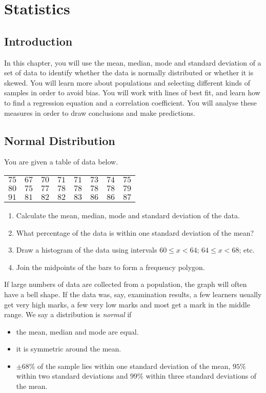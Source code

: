 \chapter{Statistics}
\label{m:s12}



\section{Introduction}
In this chapter, you will use the mean, median, mode and standard deviation of a set of data to identify whether the data is normally distributed or whether it is skewed. You will learn more about populations and selecting different kinds of samples in order to avoid bias. You will work with lines of best fit, and learn how to find a regression equation and a correlation coefficient. You will analyse these measures in order to draw conclusions and make predictions.

\section{Normal Distribution}
{You are given a table of data below. 
\begin{center}
\begin{tabular}{|cccccccc|}
\hline
$75$ & $67$ & $70$ & $71$ & $71$ & $73$ & $74$ & $75$ \\
$80$ & $75$ &$77$&$78$&$78$&$78$&$78$&$79$\\
$91$&$81$&$82$&$82$&$83$&$86$&$86$&$87$\\
\hline
\end{tabular}
\end{center}
\begin{enumerate}
\item Calculate the mean, median, mode and standard deviation of the data.
\item What percentage of the data is within one standard deviation of the mean?
\item Draw a histogram of the data using intervals $60\leq x< 64$; $64\leq x <68$; etc.
\item Join the midpoints of the bars to form a frequency polygon.
\end{enumerate}
}
If large numbers of data are collected from a population, the graph will often have a bell shape. If the data was, say, examination results, a few learners usually get very high marks, a few very low marks and most get a mark in the middle range. We say a distribution is \emph{normal} if
\begin{itemize}
\item the mean, median and mode are equal.
\item it is symmetric around the mean.
\item $\pm 68\%$ of the sample lies within one standard deviation of the mean, $95\%$ within two standard deviations and $99\%$ within three standard deviations of the mean.
\end{itemize}

